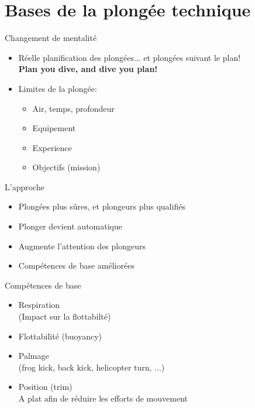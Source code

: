 
\section{Bases de la plongée technique}

\begin{frame}{Changement de mentalité}
	\begin{itemize}
		\item Réelle planification des plongées... et plongées suivant le plan!\\\textbf{Plan you dive, 	and dive you plan!}
		\item Limites de la plongée:
		\begin{itemize}
			\item Air, temps, profondeur
			\item Equipement
			\item Experience
			\item Objectifs (mission)
		\end{itemize} 
	\end{itemize}
\end{frame}

\begin{frame}{L'approche}  
	\begin{itemize}
		\item Plongées plus sûres, et plongeurs plus qualifiés
		\item Plonger devient automatique
		\item Augmente l'attention des plongeurs
		\item Compétences de base améliorées
	\end{itemize}
\end{frame}

\begin{frame}{Compétences de base}
	\begin{itemize}
		\item Respiration\\(Impact sur la flottabilté)
		\item Flottabilité (buoyancy)
		\item Palmage\\(frog kick, back kick, helicopter turn, ...)
		\item Position (trim)\\ A plat afin de réduire les efforts de mouvement
	\end{itemize}
\end{frame}